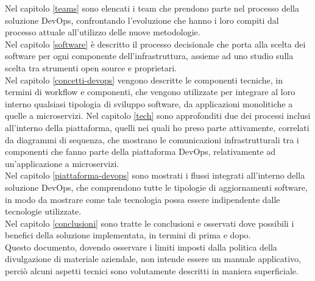 \documentclass[a4paper, 12pt]{report}
\numberwithin{equation}{section}
\begin{document}
Nel capitolo \ref{teams} sono elencati i team che prendono parte nel processo della soluzione DevOps, confrontando l'evoluzione che hanno i loro compiti dal processo attuale all'utilizzo delle nuove metodologie.\\
Nel capitolo \ref{software} è descritto il processo decisionale che porta alla scelta dei software per ogni componente dell'infrastruttura, assieme ad uno studio sulla scelta tra strumenti open source e proprietari.\\
Nel capitolo \ref{concetti-devops} vengono descritte le componenti tecniche, in termini di workflow e componenti, che vengono utilizzate per integrare al loro interno qualsiasi tipologia di sviluppo software, da applicazioni monolitiche a quelle a microservizi.
Nel capitolo \ref{tech} sono approfonditi due dei processi inclusi all'interno della piattaforma, quelli nei quali ho preso parte attivamente, correlati da diagrammi di sequenza, che mostrano le comunicazioni infrastrutturali tra i componenti che fanno parte della piattaforma DevOps, relativamente ad un'applicazione a microservizi.\\
Nel capitolo \ref{piattaforma-devops} sono mostrati i flussi integrati all'interno della soluzione DevOps, che comprendono tutte le tipologie di aggiornamenti software, in modo da mostrare come tale tecnologia possa essere indipendente dalle tecnologie utilizzate.\\
Nel capitolo \ref{conclusioni} sono tratte le conclusioni e osservati dove possibili i benefici della soluzione implementata, in termini di prima e dopo.\\
Questo documento, dovendo osservare i limiti imposti dalla politica della divulgazione di materiale aziendale, non intende essere un manuale applicativo, perciò alcuni aspetti tecnici sono volutamente descritti in maniera superficiale.
\newpage



\fancyhf{} %


\fancyhead[R]{\rightmark} \fancyhead[L]{\leftmark}
\fancyfoot[R]{\thepage}





\end{document}
